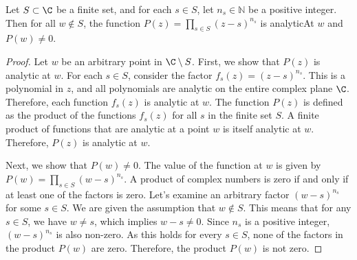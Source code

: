 \begin{lemma}\label{lem:denomAnalAt} \leanok {}
Let $S \subset \C$ be a finite set, and for each $s \in S$, let $n_s \in \mathbb{N}$ be a positive integer. Then for all $w\notin S$, the function $P(z) = \prod_{s \in S} (z-s)^{n_s}$ is analyticAt $w$ and $P(w)\neq0$.
\end{lemma}
\begin{proof}
\leanok
Let $w$ be an arbitrary point in $\C \setminus S$.
First, we show that $P(z)$ is analytic at $w$.
For each $s \in S$, consider the factor $f_s(z) = (z-s)^{n_s}$. This is a polynomial in $z$, and all polynomials are analytic on the entire complex plane $\C$. Therefore, each function $f_s(z)$ is analytic at $w$.
The function $P(z)$ is defined as the product of the functions $f_s(z)$ for all $s$ in the finite set $S$. A finite product of functions that are analytic at a point $w$ is itself analytic at $w$.
Therefore, $P(z)$ is analytic at $w$.

Next, we show that $P(w) \neq 0$.
The value of the function at $w$ is given by $P(w) = \prod_{s \in S} (w-s)^{n_s}$.
A product of complex numbers is zero if and only if at least one of the factors is zero.
Let's examine an arbitrary factor $(w-s)^{n_s}$ for some $s \in S$.
We are given the assumption that $w \notin S$. This means that for any $s \in S$, we have $w \neq s$, which implies $w-s \neq 0$.
Since $n_s$ is a positive integer, $(w-s)^{n_s}$ is also non-zero.
As this holds for every $s \in S$, none of the factors in the product $P(w)$ are zero.
Therefore, the product $P(w)$ is not zero.
\end{proof}

